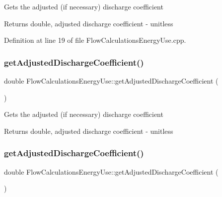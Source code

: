 Gets the adjusted (if necessary) discharge coefficient

\begin{DoxyReturn}{Returns}
double, adjusted discharge coefficient -\/ unitless 
\end{DoxyReturn}


Definition at line 19 of file Flow\+Calculations\+Energy\+Use.\+cpp.

\mbox{\label{class_flow_calculations_energy_use_a16444682b7c914d18d8456bf399b8bd2}} 
\subsubsection{\texorpdfstring{get\+Adjusted\+Discharge\+Coefficient()}{getAdjustedDischargeCoefficient()}\hspace{0.1cm}{\footnotesize\ttfamily [2/3]}}
{\footnotesize\ttfamily double Flow\+Calculations\+Energy\+Use\+::get\+Adjusted\+Discharge\+Coefficient (\begin{DoxyParamCaption}{ }\end{DoxyParamCaption})}

Gets the adjusted (if necessary) discharge coefficient

\begin{DoxyReturn}{Returns}
double, adjusted discharge coefficient -\/ unitless 
\end{DoxyReturn}
\mbox{\label{class_flow_calculations_energy_use_a16444682b7c914d18d8456bf399b8bd2}} 
\subsubsection{\texorpdfstring{get\+Adjusted\+Discharge\+Coefficient()}{getAdjustedDischargeCoefficient()}\hspace{0.1cm}{\footnotesize\ttfamily [3/3]}}
{\footnotesize\ttfamily double Flow\+Calculations\+Energy\+Use\+::get\+Adjusted\+Discharge\+Coefficient (\begin{DoxyParamCaption}{ }\end{DoxyParamCaption})}

